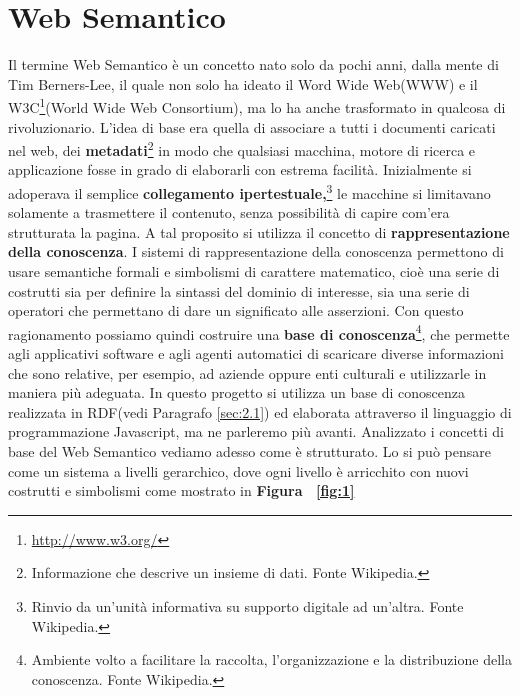 \documentclass[a4paper,11pt]{article}
\begin{document}
\section{Web Semantico}
\label{sec:2}
Il termine Web Semantico è un concetto nato solo da pochi anni, dalla mente di Tim Berners-Lee, il quale non solo ha ideato il Word Wide Web(WWW) e il W3C\footnote{\url{http://www.w3.org/}}(World Wide Web Consortium), ma lo ha anche trasformato in qualcosa di rivoluzionario. L'idea di base era quella di associare a tutti i documenti caricati nel web, dei \textbf{metadati}\footnote{Informazione che descrive un insieme di dati. Fonte Wikipedia.} in modo che qualsiasi macchina, motore di ricerca e applicazione fosse in grado di elaborarli con estrema facilità.\newline
Inizialmente si adoperava il semplice \textbf{collegamento ipertestuale,}\footnote{Rinvio da un'unità informativa su supporto digitale ad un'altra. Fonte Wikipedia.} le macchine si limitavano solamente a trasmettere il contenuto, senza possibilità di capire com'era strutturata la pagina.
A tal proposito si utilizza il concetto di \textbf{rappresentazione della conoscenza}.
I sistemi di rappresentazione della conoscenza permettono di usare semantiche formali e simbolismi di carattere matematico, cioè una serie di costrutti sia per definire la sintassi del dominio di interesse, sia una serie di operatori che permettano di dare un significato alle asserzioni.
Con questo ragionamento possiamo quindi costruire una \textbf{base di conoscenza}\footnote{Ambiente volto a facilitare la raccolta, l'organizzazione e la distribuzione della conoscenza. Fonte Wikipedia.}, che permette agli applicativi software e agli agenti automatici di scaricare diverse informazioni che sono relative, per esempio, ad aziende oppure enti culturali e utilizzarle in maniera più adeguata. In questo progetto si utilizza un base di conoscenza realizzata in RDF(vedi Paragrafo \ref{sec:2.1}) ed elaborata attraverso il linguaggio di programmazione Javascript, ma ne parleremo più avanti.\newline
Analizzato i concetti di base del Web Semantico vediamo adesso come è strutturato. Lo si può pensare come un sistema a livelli gerarchico, dove ogni livello è arricchito con nuovi costrutti e simbolismi come mostrato in \textbf{Figura ~\ref{fig:1}}
\end{document}
